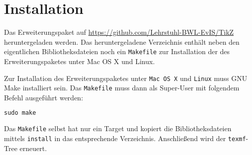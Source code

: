\documentclass[12pt, a4paper]{article}
\begin{document}
\section{Installation}
\label{sec:Installation}
Das Erweiterungspaket auf \url{https://github.com/Lehrstuhl-BWL-EvIS/TikZ} heruntergeladen werden. Das heruntergeladene Verzeichnis enthält neben den eigentlichen Bibliotheksdateien noch ein \texttt{Makefile} zur Installation der des Erweiterungspaketes unter \textsf{Mac OS X} und \textsf{Linux}.\medskip

\noindent Zur Installation des Erweiterungspaketes unter \texttt{Mac OS X} und \texttt{Linux} muss \textsf{GNU Make} installiert sein.
Das \texttt{Makefile} muss dann als Super-User mit folgendem Befehl ausgeführt werden:
\begin{lstlisting}[language=C]
    sudo make
\end{lstlisting}
Das \texttt{Makefile} selbst hat nur ein Target und kopiert die Bibliotheksdateien mittels \texttt{install} in das entsprechende Verzeichnis. Anschließend wird der \texttt{texmf}-Tree erneuert.
\end{document}
